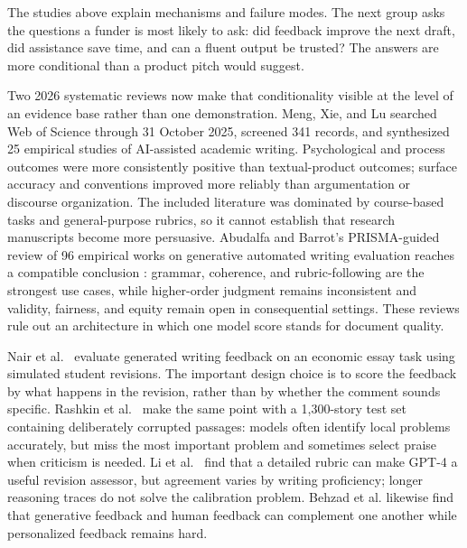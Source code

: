 The studies above explain mechanisms and failure modes. The next group asks
the questions a funder is most likely to ask: did feedback improve the next
draft, did assistance save time, and can a fluent output be trusted? The
answers are more conditional than a product pitch would suggest.

Two 2026 systematic reviews now make that conditionality visible at the
level of an evidence base rather than one demonstration. Meng, Xie, and Lu
\citep{meng2026systematic} searched Web of Science through 31 October 2025,
screened 341 records, and synthesized 25 empirical studies of AI-assisted
academic writing. Psychological and process outcomes were more consistently
positive than textual-product outcomes; surface accuracy and conventions
improved more reliably than argumentation or discourse organization. The
included literature was dominated by course-based tasks and general-purpose
rubrics, so it cannot establish that research manuscripts become more
persuasive. Abudalfa and Barrot's PRISMA-guided review of 96 empirical works
on generative automated writing evaluation reaches a compatible conclusion
\citep{abudalfa2026awe}: grammar, coherence, and rubric-following are the
strongest use cases, while higher-order judgment remains inconsistent and
validity, fairness, and equity remain open in consequential settings. These
reviews rule out an architecture in which one model score stands for document
quality.

Nair et al.\ \citep{nair2024closing} evaluate generated writing feedback on an
economic essay task using simulated student revisions. The important design
choice is to score the feedback by what happens in the revision, rather than
by whether the comment sounds specific. Rashkin et al.\ \citep{rashkin2025story}
make the same point with a 1,300-story test set containing deliberately
corrupted passages: models often identify local problems accurately, but miss
the most important problem and sometimes select praise when criticism is
needed. Li et al.\ \citep{li2024revisions} find that a detailed rubric can make
GPT-4 a useful revision assessor, but agreement varies by writing proficiency;
longer reasoning traces do not solve the calibration problem. Behzad et al.
\citep{behzad2024feedback} likewise find that generative feedback and human
feedback can complement one another while personalized feedback remains hard.

